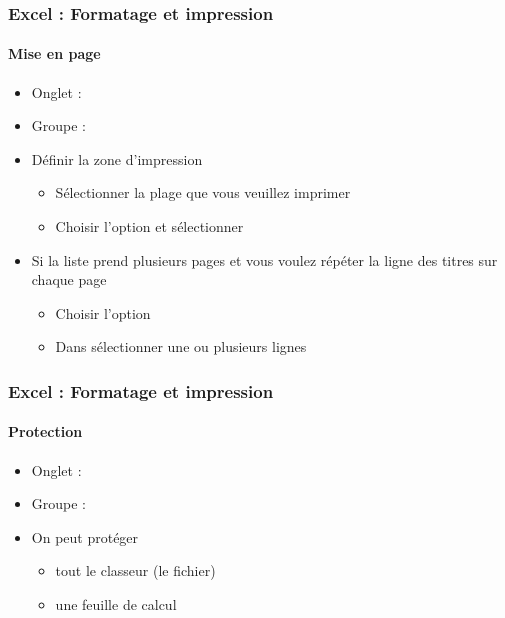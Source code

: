 \documentclass[xcolor=table, usenames,dvipsnames]{beamer}
\begin{document}
\begin{frame}
\frametitle{Excel : Formatage et impression}
\framesubtitle{Mise en page}

\begin{minipage}{0.54\textwidth}
	\begin{itemize}
		\item Onglet : 
		\item Groupe : 
		\item Définir la zone d'impression 
		\begin{itemize}
			\item Sélectionner la plage que vous veuillez imprimer
			\item Choisir l'option  et sélectionner 
		\end{itemize}
		\item Si la liste prend plusieurs pages et vous voulez répéter la ligne des titres sur chaque page 
		\begin{itemize}
			\item Choisir l'option 
			\item Dans  sélectionner une ou plusieurs lignes
		\end{itemize}
	\end{itemize}
\end{minipage}
%
\begin{minipage}{0.45\textwidth}
	
\end{minipage}

\end{frame}

\begin{frame}
\frametitle{Excel : Formatage et impression}
\framesubtitle{Protection}

\begin{minipage}{0.54\textwidth}
	\begin{itemize}
		\item Onglet : 
		\item Groupe : 
		\item On peut protéger
		\begin{itemize}
			\item tout le classeur (le fichier)
			\item une feuille de calcul
		\end{itemize}
	\end{itemize}
\end{minipage}
%
\begin{minipage}{0.45\textwidth}
	
\end{minipage}

\end{frame}


\end{document}
